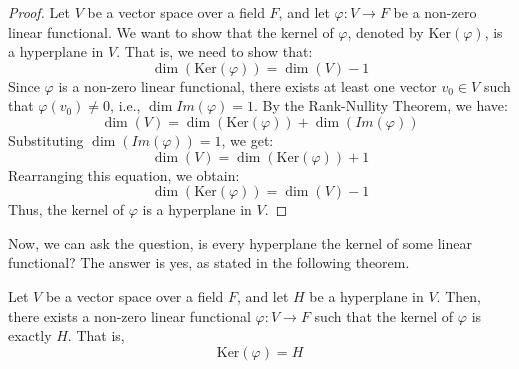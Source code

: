 \documentclass[openany]{book}
\begin{document}
\begin{proof}
Let $V$ be a vector space over a field $F$, and let $\varphi: V \to F$ be a non-zero linear functional. We want to show that the kernel of $\varphi$, denoted by $\text{Ker}(\varphi)$, is a hyperplane in $V$. That is, we need to show that:
$$\dim(\text{Ker}(\varphi)) = \dim(V) - 1$$
Since $\varphi$ is a non-zero linear functional, there exists at least one vector $v_0 \in V$ such that $\varphi(v_0) \neq 0$, i.e., $\dim Im (\varphi) = 1$. By the Rank-Nullity Theorem, we have:
$$\dim(V) = \dim(\text{Ker}(\varphi)) + \dim(Im(\varphi))$$
Substituting $\dim(Im(\varphi)) = 1$, we get:
$$\dim(V) = \dim(\text{Ker}(\varphi)) + 1$$
Rearranging this equation, we obtain:
$$\dim(\text{Ker}(\varphi)) = \dim(V) - 1$$
Thus, the kernel of $\varphi$ is a hyperplane in $V$.
\end{proof}
Now, we can ask the question, is every hyperplane the kernel of some linear functional? The answer is yes, as stated in the following theorem.
\begin{mytheorem}
Let $V$ be a vector space over a field $F$, and let $H$ be a hyperplane in $V$. Then, there exists a non-zero linear functional $\varphi: V \to F$ such that the kernel of $\varphi$ is exactly $H$. That is,
$$\text{Ker}(\varphi) = H$$
\end{mytheorem}
\end{document}
